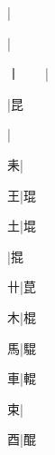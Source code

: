 \begin{multicols}{2}
{{\cjk{}{\cnsym{}　}{\cnsym{}　}{\cnsym{}　}}|{}\par
{\cjk{}{\cnsym{}　}{\cnsym{}　}{\cnsym{}　}}|{}\par
{\cjk{}丨{\cnsym{}　}{\cnsym{}　}}|{}\par
{\cjk{}{\cnsym{}　}{\cnsym{}　}{\cnsym{}　}}|{\cjk{}昆}\par
{\cjk{}{\cnsym{}　}{\cnsym{}　}{\cnsym{}　}}|{}\par
{\cjk{}{\cnsym{}　}{\cnsym{}　}耒}|{}\par
{\cjk{}{\cnsym{}　}{\cnsym{}　}王}|{\cjk{}琨}\par
{\cjk{}{\cnsym{}　}{\cnsym{}　}土}|{\cjk{}堒}\par
{}|{\cjk{}掍}\par
{\cjk{}{\cnsym{}　}{\cnsym{}　}卄}|{\cjk{}菎}\par
{\cjk{}{\cnsym{}　}{\cnsym{}　}木}|{\cjk{}棍}\par
{\cjk{}{\cnsym{}　}{\cnsym{}　}馬}|{\cjk{}騉}\par
{\cjk{}{\cnsym{}　}{\cnsym{}　}車}|{\cjk{}輥}\par
{\cjk{}{\cnsym{}　}{\cnsym{}　}束}|{}\par
{\cjk{}{\cnsym{}　}{\cnsym{}　}酉}|{\cjk{}醌}\par
}
\end{multicols}
